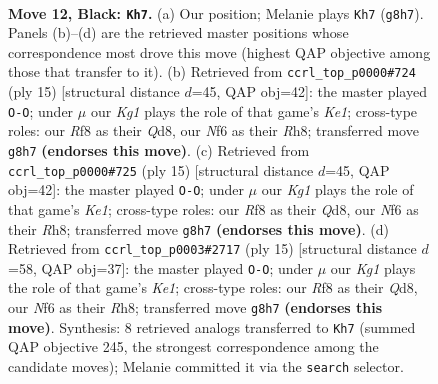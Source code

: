\documentclass[11pt]{article}
\begin{document}
\clearpage

\begin{figure}[p]\centering
\begin{subfigure}{0.46\textwidth}\centering
\resizebox{\linewidth}{!}{%
\newchessgame
\chessboard[
  setfen={r1bq1rk1/bpp2pp1/2np1n1p/1B2p2P/P3P3/2PP1N2/5PP1/RNBQ1RK1 b - - 0 12},
  showmover=false,
  pgfstyle=straightmove, color=movearrow, markmove={g8-h7}
]}
\caption{}
\end{subfigure}\hfill
\begin{subfigure}{0.46\textwidth}\centering
\resizebox{\linewidth}{!}{%
\newchessgame
\chessboard[
  setfen={r1bqk2r/bpp2ppp/p1np1n2/4p3/P1B1P3/2PP1N1P/1P3PP1/RNBQ1RK1 b kq - 0 8},
  showmover=false,
  pgfstyle=straightmove, color=movearrow, markmove={e8-g8}
]}
\caption{}
\end{subfigure}
\\[4pt]
\begin{subfigure}{0.46\textwidth}\centering
\resizebox{\linewidth}{!}{%
\newchessgame
\chessboard[
  setfen={r1bqk2r/bpp2ppp/p1np1n2/4p3/P1B1P3/2PP1N1P/1P3PP1/RNBQ1RK1 b kq - 0 8},
  showmover=false,
  pgfstyle=straightmove, color=movearrow, markmove={e8-g8}
]}
\caption{}
\end{subfigure}\hfill
\begin{subfigure}{0.46\textwidth}\centering
\resizebox{\linewidth}{!}{%
\newchessgame
\chessboard[
  setfen={r1bqk2r/bpp2ppp/p1np1n2/4p3/P1B1P3/2PP1N2/1P3PPP/RNBQR1K1 b kq - 2 8},
  showmover=false,
  pgfstyle=straightmove, color=movearrow, markmove={e8-g8}
]}
\caption{}
\end{subfigure}
\caption{\textbf{Move 12, Black: \texttt{Kh7}.} (a) Our position; Melanie plays \texttt{Kh7} (\texttt{g8h7}). Panels (b)--(d) are the retrieved master positions whose correspondence most drove this move (highest QAP objective among those that transfer to it). (b) Retrieved from \texttt{ccrl\_top\_p0000\#724} (ply 15) [structural distance $d$=45, QAP obj=42]: the master played \texttt{O-O}; under $\mu$ our \emph{Kg1} plays the role of that game's \emph{Ke1}; cross-type roles: our \emph{R}f8 as their \emph{Q}d8, our \emph{N}f6 as their \emph{R}h8; transferred move \texttt{g8h7} \textbf{(endorses this move)}. (c) Retrieved from \texttt{ccrl\_top\_p0000\#725} (ply 15) [structural distance $d$=45, QAP obj=42]: the master played \texttt{O-O}; under $\mu$ our \emph{Kg1} plays the role of that game's \emph{Ke1}; cross-type roles: our \emph{R}f8 as their \emph{Q}d8, our \emph{N}f6 as their \emph{R}h8; transferred move \texttt{g8h7} \textbf{(endorses this move)}. (d) Retrieved from \texttt{ccrl\_top\_p0003\#2717} (ply 15) [structural distance $d$=58, QAP obj=37]: the master played \texttt{O-O}; under $\mu$ our \emph{Kg1} plays the role of that game's \emph{Ke1}; cross-type roles: our \emph{R}f8 as their \emph{Q}d8, our \emph{N}f6 as their \emph{R}h8; transferred move \texttt{g8h7} \textbf{(endorses this move)}. Synthesis: 8 retrieved analogs transferred to \texttt{Kh7} (summed QAP objective 245, the strongest correspondence among the candidate moves); Melanie committed it via the \texttt{search} selector.}
\label{fig:thought-m23}
\end{figure}
\end{document}
